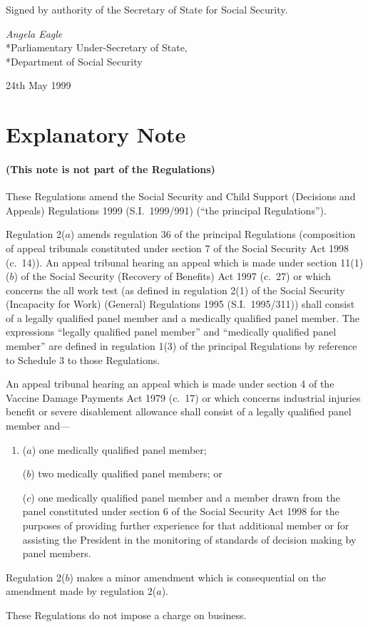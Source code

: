 \documentclass[12pt,a4paper]{article}
\begin{document}
Signed 
by authority of the Secretary of State for Social Security.

{\raggedleft
\emph{Angela Eagle
}\\*Parliamentary Under-Secretary of State,\\*Department of Social Security

}

24th May 1999

\small

\part{Explanatory Note}

\renewcommand\parthead{--- Explanatory Note}

\subsection*{(This note is not part of the Regulations)}

These Regulations amend the Social Security and Child Support (Decisions and Appeals) Regulations 1999 (S.I.\ 1999/991) (“the principal Regulations”).

Regulation 2($a$) amends regulation 36 of the principal Regulations (composition of appeal tribunals constituted under section 7 of the Social Security Act 1998 (c.\ 14)). An appeal tribunal hearing an appeal which is made under section 11(1)($b$) of the Social Security (Recovery of Benefits) Act 1997 (c.\ 27) or which concerns the all work test (as defined in regulation 2(1) of the Social Security (Incapacity for Work) (General) Regulations 1995 (S.I.\ 1995/311)) shall consist of a legally qualified panel member and a medically qualified panel member. The expressions “legally qualified panel member” and “medically qualified panel member” are defined in regulation 1(3) of the principal Regulations by reference to Schedule 3 to those Regulations.

An appeal tribunal hearing an appeal which is made under section 4 of the Vaccine Damage Payments Act 1979 (c.\ 17) or which concerns industrial injuries benefit or severe disablement allowance shall consist of a legally qualified panel member and—
\begin{enumerate}\item[]
($a$) one medically qualified panel member;

($b$) two medically qualified panel members; or

($c$) one medically qualified panel member and a member drawn from the panel constituted under section 6 of the Social Security Act 1998 for the purposes of providing further experience for that additional member or for assisting the President in the monitoring of standards of decision making by panel members.
\end{enumerate}

Regulation 2($b$) makes a minor amendment which is consequential on the amendment made by regulation 2($a$).

These Regulations do not impose a charge on business. 
\end{document}
